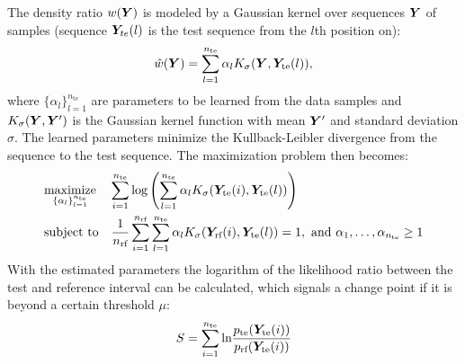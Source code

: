The density ratio $w(\matrixsym{Y})$ is modeled by a Gaussian kernel over sequences $\matrixsym{Y}$ of samples (sequence $\matrixsym{Y}_{te}(l)$ is the test sequence from the $l$th position on):
%
\begin{equation}
  \hat{w}(\matrixsym{Y}) = \sum_{l=1}^{n_\text{te}} \alpha_l K_\sigma(\matrixsym{Y}, \matrixsym{Y}_\text{te}(l)),
\end{equation}
%
where $\{\alpha_l\}_{l=1}^{n_\text{te}}$ are parameters to be learned from the data samples and $K_\sigma(\matrixsym{Y}, \matrixsym{Y}')$ is the Gaussian kernel function with mean $\matrixsym{Y}'$ and standard deviation $\sigma$.
The learned parameters minimize the Kullback-Leibler divergence from the sequence to the test sequence.
The maximization problem then becomes:
%
\begin{equation}
  \maximize{\{\alpha_l\}_{l=1}^{n_\text{te}}}
    {\sum_{i=1}^{n_\text{te}} \text{log} \left(\sum_{l=1}^{n_\text{te}} \alpha_l K_\sigma(\matrixsym{Y}_\text{te}(i), \matrixsym{Y}_\text{te}(l) ) \right)}
    {\frac{1}{n_\text{rf}} \sum_{i=1}^{n_\text{rf}} \sum_{l=1}^{n_\text{te}} \alpha_l K_\sigma(\matrixsym{Y}_\text{rf}(i), \matrixsym{Y}_\text{te}(l)) = 1, ~ \text{and} ~ \alpha_1, \dots ,\alpha_{n_\text{te}} \geq 1}
\end{equation}
%
With the estimated parameters the logarithm of the likelihood ratio between the test and reference interval can be calculated, which signals a change point if it is beyond a certain threshold $\mu$:
%
\begin{equation}
  S = \sum_{i=1}^{n_\text{te}} \text{ln}
    \frac
    {p_\text{te}(\matrixsym{Y}_\text{te}(i))}
    {p_\text{rf}(\matrixsym{Y}_\text{te}(i))}
\end{equation}







\clearpage
